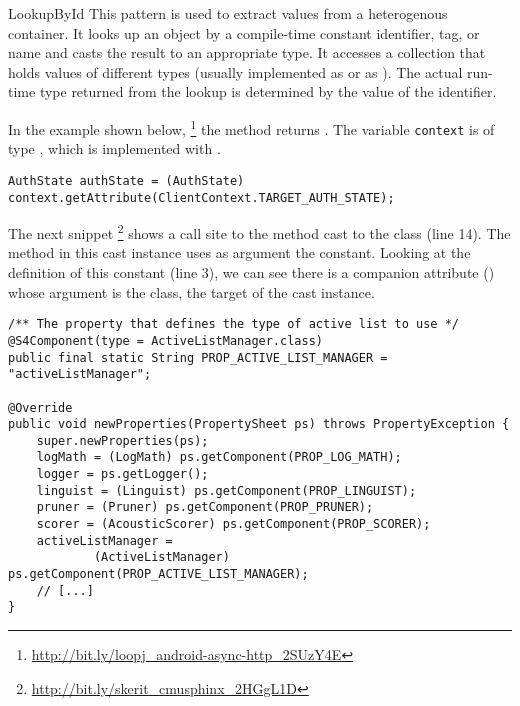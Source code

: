 \begin{pattern}{LookupById}
This pattern is used to extract values from a heterogenous container.
It looks up an object by a compile-time constant identifier, tag, or name and casts the result to an appropriate type.
It accesses a collection that holds values of different types
(usually implemented as  or as ).
The actual run-time type returned from the lookup is determined by the value of the identifier.

\instances{}
In the example shown below,%
\footnote{\url{http://bit.ly/loopj_android-async-http_2SUzY4E}}
the  method returns .
The variable \texttt{context} is of type ,
which is implemented with .

\begin{verbatim}
AuthState authState = (AuthState) context.getAttribute(ClientContext.TARGET_AUTH_STATE);
\end{verbatim}

The next snippet%
\footnote{\url{http://bit.ly/skerit_cmusphinx_2HGgL1D}}
shows a call site to the  method cast to the  class (line 14).
The  method in this cast instance uses as argument the  constant.
Looking at the definition of this constant (line 3),
we can see there is a companion attribute () whose argument is the  class, the target of the cast instance.

\begin{verbatim}
/** The property that defines the type of active list to use */
@S4Component(type = ActiveListManager.class)
public final static String PROP_ACTIVE_LIST_MANAGER = "activeListManager";

@Override
public void newProperties(PropertySheet ps) throws PropertyException {
    super.newProperties(ps);
    logMath = (LogMath) ps.getComponent(PROP_LOG_MATH);
    logger = ps.getLogger();
    linguist = (Linguist) ps.getComponent(PROP_LINGUIST);
    pruner = (Pruner) ps.getComponent(PROP_PRUNER);
    scorer = (AcousticScorer) ps.getComponent(PROP_SCORER);
    activeListManager = 
            (ActiveListManager) ps.getComponent(PROP_ACTIVE_LIST_MANAGER);
    // [...]
}
\end{verbatim}


\end{pattern}
